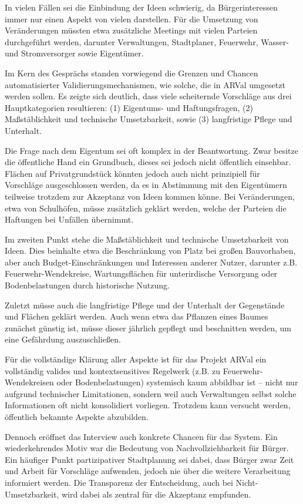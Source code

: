 In vielen Fällen sei die Einbindung der Ideen schwierig, da Bürgerinteressen immer nur einen Aspekt von vielen darstellen. Für die Umsetzung von Veränderungen müssten etwa zusätzliche Meetings mit vielen Parteien durchgeführt werden, darunter Verwaltungen, Stadtplaner, Feuerwehr, Wasser- und Stromversorger sowie Eigentümer.

\medskip

Im Kern des Gesprächs standen vorwiegend die Grenzen und Chancen automatisierter Validierungsmechanismen, wie solche, die in ARVal umgesetzt werden sollen. Es zeigte sich deutlich, dass viele scheiternde Vorschläge aus drei Hauptkategorien resultieren: (1) Eigentums- und Haftungsfragen, (2) Maßstäblichkeit und technische Umsetzbarkeit, sowie (3) langfristige Pflege und Unterhalt.

Die Frage nach dem Eigentum sei oft komplex in der Beantwortung. Zwar besitze die öffentliche Hand ein Grundbuch, dieses sei jedoch nicht öffentlich einsehbar. Flächen auf Privatgrundstück könnten jedoch auch nicht prinzipiell für Vorschläge ausgeschlossen werden, da es in Abstimmung mit den Eigentümern teilweise trotzdem zur Akzeptanz von Ideen kommen könne. Bei Veränderungen, etwa von Schulhöfen, müsse zusätzlich geklärt werden, welche der Parteien die Haftungen bei Unfällen übernimmt.

Im zweiten Punkt stehe die Maßstäblichkeit und technische Umsetzbarkeit von Ideen. Dies beinhalte etwa die Beschränkung von Platz bei großen Bauvorhaben, aber auch Budget-Einschränkungen und Interessen anderer Nutzer, darunter z.B. Feuerwehr-Wendekreise, Wartungsflächen für unterirdische Versorgung oder Bodenbelastungen durch historische Nutzung.

Zuletzt müsse auch die langfristige Pflege und der Unterhalt der Gegenstände und Flächen geklärt werden. Auch wenn etwa das Pflanzen eines Baumes zunächst günstig ist, müsse dieser jährlich gepflegt und beschnitten werden, um eine Gefährdung auszuschließen.

Für die vollständige Klärung aller Aspekte ist für das Projekt ARVal ein vollständig valides und kontextsensitives Regelwerk (z.B. zu Feuerwehr-Wendekreisen oder Bodenbelastungen) systemisch kaum abbildbar ist – nicht nur aufgrund technischer Limitationen, sondern weil auch Verwaltungen selbst solche Informationen oft nicht konsolidiert vorliegen. Trotzdem kann versucht werden, öffentlich bekannte Aspekte abzubilden.

\medskip

Dennoch eröffnet das Interview auch konkrete Chancen für das System. Ein wiederkehrendes Motiv war die Bedeutung von Nachvollziehbarkeit für Bürger. Ein häufiger Punkt partizipativer Stadtplanung sei dabei, dass Bürger zwar Zeit und Arbeit für Vorschläge aufwenden, jedoch nie über die weitere Verarbeitung informiert werden. Die Transparenz der Entscheidung, auch bei Nicht-Umsetzbarkeit, wird dabei als zentral für die Akzeptanz empfunden.

